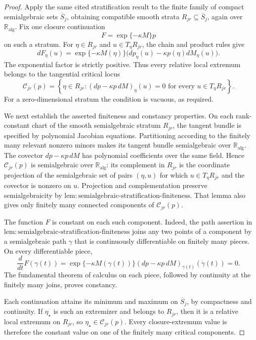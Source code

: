 \documentclass{article}
\begin{document}
\begin{proof}
Apply the same cited stratification result to the finite family of compact semialgebraic sets \(\overline S_j\), obtaining compatible smooth strata \(R_{jr}\subseteq\overline S_j\), again over \(\mathbb R_{\mathrm{alg}}\).  Fix one closure continuation
\[
 F=\exp\{-\kappa M\}p
\]
on such a stratum.  For \(\eta\in R_{jr}\) and \(u\in T_\eta R_{jr}\), the chain and product rules give
\[
 dF_\eta(u)=\exp\{-\kappa M(\eta)\}
 \bigl(dp_\eta(u)-\kappa p(\eta)dM_\eta(u)\bigr).
\]
The exponential factor is strictly positive.  Thus every relative local extremum belongs to the tangential critical locus
\[
 \mathcal C_{jr}(p)=
 \left\{\eta\in R_{jr}:
 (dp-\kappa p\,dM)_\eta(u)=0
 \text{ for every }u\in T_\eta R_{jr}\right\}.
\]
For a zero-dimensional stratum the condition is vacuous, as required.

We next establish the asserted finiteness and constancy properties.  On each rank-constant chart of the smooth semialgebraic stratum \(R_{jr}\), the tangent bundle is specified by polynomial Jacobian equations.  Partitioning according to the finitely many relevant nonzero minors makes its tangent bundle semialgebraic over \(\mathbb R_{\mathrm{alg}}\).  The covector \(dp-\kappa p\,dM\) has polynomial coefficients over the same field.  Hence \(\mathcal C_{jr}(p)\) is semialgebraic over \(\mathbb R_{\mathrm{alg}}\): its complement in \(R_{jr}\) is the coordinate projection of the semialgebraic set of pairs \((\eta,u)\) for which \(u\in T_\eta R_{jr}\) and the covector is nonzero on \(u\).  Projection and complementation preserve semialgebraicity by \(\mathrm{lem{:}semialgebraic\text{-}stratification\text{-}finiteness}\).  That lemma also gives only finitely many connected components of \(\mathcal C_{jr}(p)\).

The function \(F\) is constant on each such component.  Indeed, the path assertion in \(\mathrm{lem{:}semialgebraic\text{-}stratification\text{-}finiteness}\) joins any two points of a component by a semialgebraic path \(\gamma\) that is continuously differentiable on finitely many pieces.  On every differentiable piece,
\[
 \frac{d}{dt}F(\gamma(t))
 =\exp\{-\kappa M(\gamma(t))\}
 (dp-\kappa p\,dM)_{\gamma(t)}(\dot\gamma(t))=0.
\]
The fundamental theorem of calculus on each piece, followed by continuity at the finitely many joins, proves constancy.

Each continuation attains its minimum and maximum on \(\overline S_j\), by compactness and continuity.  If \(\eta_\star\) is such an extremizer and belongs to \(R_{jr}\), then it is a relative local extremum on \(R_{jr}\), so \(\eta_\star\in\mathcal C_{jr}(p)\).  Every closure-extremum value is therefore the constant value on one of the finitely many critical components.


\end{proof}
\end{document}
